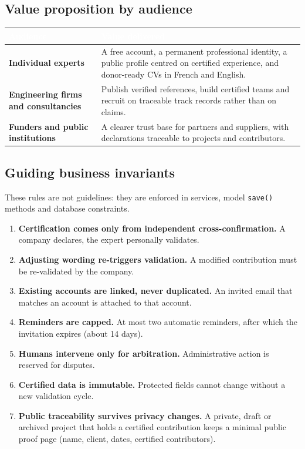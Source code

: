 \documentclass[11pt,a4paper]{article}
\renewcommand{\arraystretch}{1.25}
\newcommand{\theadcell}[1]{\textcolor{white}{\textbf{#1}}}
\newcommand{\tablehead}[1]{\rowcolor{mil900}#1}
\newcommand{\tablealt}{\rowcolor{mil50}}
\begin{document}
\subsection{Value proposition by audience}

\begin{center}
\renewcommand{\arraystretch}{1.35}
\begin{tabularx}{\textwidth}{@{}L{3.4cm}Y@{}}
  \toprule
  \tablehead{\theadcell{Audience} & \theadcell{Value delivered}} \\
  \midrule
  \textbf{Individual experts} &
  A free account, a permanent professional identity, a public profile centred
  on certified experience, and donor-ready CVs in French and English. \\
  \tablealt
  \textbf{Engineering firms and consultancies} &
  Publish verified references, build certified teams and recruit on traceable
  track records rather than on claims. \\
  \textbf{Funders and public institutions} &
  A clearer trust base for partners and suppliers, with declarations traceable
  to projects and contributors. \\
  \bottomrule
\end{tabularx}
\end{center}

\subsection{Guiding business invariants}

These rules are not guidelines: they are enforced in services, model
\texttt{save()} methods and database constraints.

\begin{enumerate}[leftmargin=1.8em,itemsep=4pt]
  \item \textbf{Certification comes only from independent cross-confirmation.}
        A company declares, the expert personally validates.
  \item \textbf{Adjusting wording re-triggers validation.} A modified
        contribution must be re-validated by the company.
  \item \textbf{Existing accounts are linked, never duplicated.} An invited
        email that matches an account is attached to that account.
  \item \textbf{Reminders are capped.} At most two automatic reminders, after
        which the invitation expires (about 14 days).
  \item \textbf{Humans intervene only for arbitration.} Administrative action
        is reserved for disputes.
  \item \textbf{Certified data is immutable.} Protected fields cannot change
        without a new validation cycle.
  \item \textbf{Public traceability survives privacy changes.} A private,
        draft or archived project that holds a certified contribution keeps a
        minimal public proof page (name, client, dates, certified contributors).
\end{enumerate}
\end{document}
